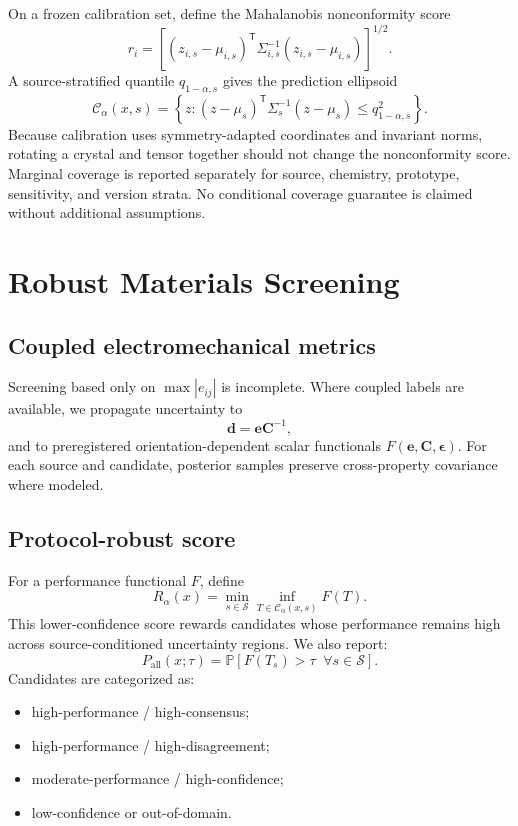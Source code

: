 \documentclass[11pt]{article}
\newcommand{\E}{\mathbf{e}}
\newcommand{\Cten}{\mathbf{C}}
\newcommand{\epsT}{\boldsymbol{\epsilon}}
\newcommand{\Prob}{\mathbb{P}}
\begin{document}
On a frozen calibration set, define the Mahalanobis nonconformity score
\begin{equation}
r_i
=
\left[
(z_{i,s}-\mu_{i,s})^\mathsf{T}
\Sigma_{i,s}^{-1}
(z_{i,s}-\mu_{i,s})
\right]^{1/2}.
\end{equation}
A source-stratified quantile $q_{1-\alpha,s}$ gives the prediction ellipsoid
\begin{equation}
\mathcal C_{\alpha}(x,s)
=
\left\{
z:
(z-\mu_s)^\mathsf{T}\Sigma_s^{-1}(z-\mu_s)
\le q_{1-\alpha,s}^{2}
\right\}.
\end{equation}
Because calibration uses symmetry-adapted coordinates and invariant norms, rotating a crystal and tensor together should not change the nonconformity score. Marginal coverage is reported separately for source, chemistry, prototype, sensitivity, and version strata. No conditional coverage guarantee is claimed without additional assumptions.

\section{Robust Materials Screening}

\subsection{Coupled electromechanical metrics}

Screening based only on $\max |e_{ij}|$ is incomplete. Where coupled labels are available, we propagate uncertainty to
\begin{equation}
\mathbf d = \E\Cten^{-1},
\end{equation}
and to preregistered orientation-dependent scalar functionals $F(\E,\Cten,\epsT)$. For each source and candidate, posterior samples preserve cross-property covariance where modeled.

\subsection{Protocol-robust score}

For a performance functional $F$, define
\begin{equation}
R_{\alpha}(x)
=
\min_{s\in\mathcal S}
\inf_{T\in\mathcal C_{\alpha}(x,s)}
F(T).
\label{eq:robustscore}
\end{equation}
This lower-confidence score rewards candidates whose performance remains high across source-conditioned uncertainty regions. We also report:
\begin{equation}
P_{\mathrm{all}}(x;\tau)
=
\Prob\left[
F(T_s)>\tau
\;\; \forall s\in\mathcal S
\right].
\end{equation}
Candidates are categorized as:
\begin{itemize}[leftmargin=1.5em]
    \item high-performance / high-consensus;
    \item high-performance / high-disagreement;
    \item moderate-performance / high-confidence;
    \item low-confidence or out-of-domain.
\end{itemize}
\end{document}
